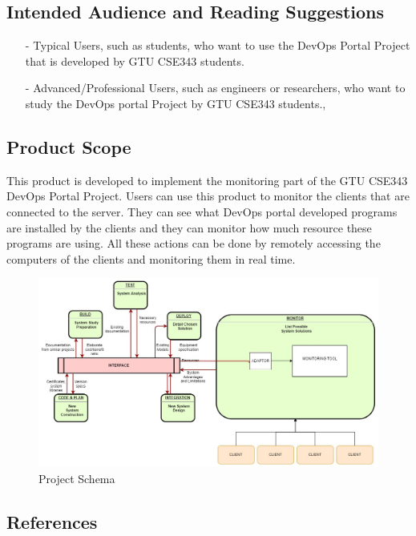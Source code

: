 \documentclass{article}
\begin{document}
     \subsection{Intended Audience and Reading Suggestions}
\flushleft 
\begin{itemize}
	\item[-] 
	Typical Users, such as students, who want to use the DevOps Portal Project that is developed by GTU CSE343 students.
	\item[-] Advanced/Professional Users, such as engineers or researchers, who want to study the DevOps portal Project by  GTU CSE343 students.,
\end{itemize}

     \subsection{Product Scope}

     This product is developed to implement the monitoring part of the GTU CSE343 DevOps Portal Project. Users can use this product to monitor the clients that are connected to the server. They can see what DevOps portal developed programs are installed by the clients and they can monitor how much resource these programs are using. All these actions can be done by remotely accessing the computers of the clients and monitoring them in real time.

\begin{figure}[h]
\centering
\includegraphics[scale=0.4]{schema.jpg}
\caption{Project Schema \label{overflow}}
\end{figure}



\subsection{References}
     
\end{document}

